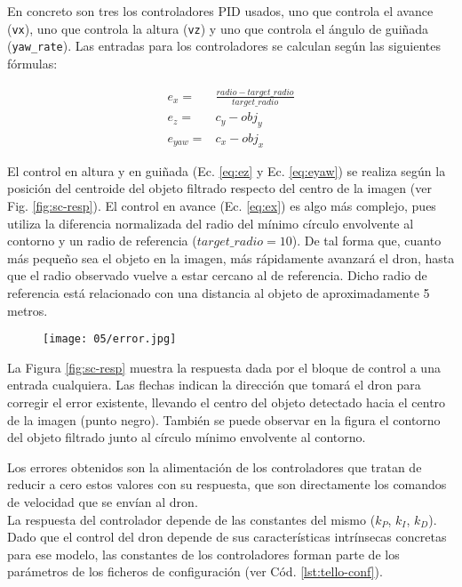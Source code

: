 \documentclass[../main.tex]{subfiles}
\begin{document}
En concreto son tres los controladores PID usados, uno que controla el avance (\lstinline{vx}), uno que controla la altura (\lstinline{vz}) y uno que controla el ángulo de guiñada (\lstinline{yaw_rate}). Las entradas para los controladores se calculan según las siguientes fórmulas:

\begin{align}
    e_x = & \frac{radio - target\_radio}{target\_radio} \label{eq:ex} \\
    e_z = & c_y - obj_y \label{eq:ez} \\
    e_{yaw} = & c_x - obj_x \label{eq:eyaw}
\end{align}

El control en altura y en guiñada (Ec. \ref{eq:ez} y Ec. \ref{eq:eyaw}) se realiza según la posición del centroide del objeto filtrado respecto del centro de la imagen (ver Fig. \ref{fig:sc-resp}). El control en avance (Ec. \ref{eq:ex}) es algo más complejo, pues utiliza la diferencia normalizada del radio del mínimo círculo envolvente al contorno y un radio de referencia ($target\_radio = 10$). De tal forma que, cuanto más pequeño sea el objeto en la imagen, más rápidamente avanzará el dron, hasta que el radio observado vuelve a estar cercano al de referencia. Dicho radio de referencia está relacionado con una distancia al objeto de aproximadamente 5 metros.

\begin{figure}[!ht]
 	{\texttt{[image: 05/error.jpg]}}
\end{figure}

La Figura \ref{fig:sc-resp} muestra la respuesta dada por el bloque de control a una entrada cualquiera. Las flechas indican la dirección que tomará el dron para corregir el error existente, llevando el centro del objeto detectado hacia el centro de la imagen (punto negro). También se puede observar en la figura el contorno del objeto filtrado junto al círculo mínimo envolvente al contorno.

Los errores obtenidos son la alimentación de los controladores que tratan de reducir a cero estos valores con su respuesta, que son directamente los comandos de velocidad que se envían al dron. \\
La respuesta del controlador depende de las constantes del mismo ($k_P$, $k_I$, $k_D$). Dado que el control del dron depende de sus características intrínsecas concretas para ese modelo, las constantes de los controladores forman parte de los parámetros de los ficheros de configuración (ver Cód. \ref{lst:tello-conf}).
\end{document}

